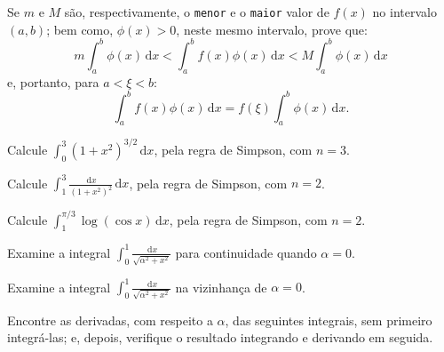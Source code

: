 \documentclass[11pt, a5paper]{exam}
\newcommand{\dd}{\,\mathrm{d}}
\begin{document}
\begin{questions}
\question 
Se $ m $ e $ M $ são, respectivamente, o \texttt{menor} e o \texttt{maior} valor 
de $ f(x) $ no intervalo $(a, b)$; bem como, $ \phi{(x)} > 0 $, neste mesmo 
intervalo, prove que:
\[
  m \int_{a}^{b} \phi(x) \dd{x} < \int_{a}^{b} f(x) \phi{(x)} \dd{x} < M \int_{a}^{b} \phi{(x)} \dd{x}
\]
e, portanto, para $ a < \xi < b $:
\[
  \int_{a}^{b} f(x) \phi{(x)} \dd{x} = f(\xi) \int_{a}^{b} \phi{(x)} \dd{x}.
\]

\question 
Calcule $ \displaystyle \int_{0}^{3} \left( 1 + x^2 \right)^{3/2} \dd{x} $, pela
regra de Simpson, com $ n = 3 $.

\question 
Calcule $ \displaystyle \int_{1}^{3} \frac{\dd{x}}{\left( 1 + x^2 \right)^{2}} \dd{x} $, 
pela regra de Simpson, com $ n = 2 $.

\question 
Calcule $ \displaystyle \int_{1}^{\pi/3} \log{(\cos{x})}\dd{x} $, 
pela regra de Simpson, com $ n = 2 $.

\question 
Examine a integral 
$ \displaystyle \int_{0}^{1} \frac{\dd{x}}{\sqrt{\alpha^2 + x^2}} $ para 
continuidade quando $ \alpha = 0 $.

\question 
Examine a integral 
$ \displaystyle \int_{0}^{1} \frac{\dd{x}}{\sqrt{\alpha^2 + x^2}} $ na
vizinhança de $ \alpha = 0 $.


\question Encontre as derivadas, com respeito a $ \alpha $, das seguintes 
integrais, sem primeiro integrá-las; e, depois, verifique o resultado integrando 
e derivando em seguida.


\end{questions}
\end{document}
